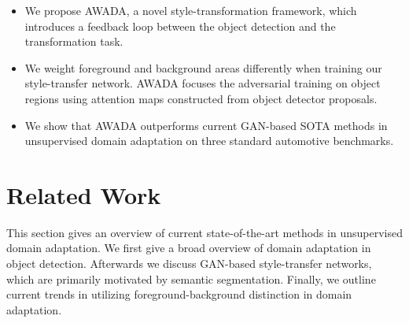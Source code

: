 \documentclass[10pt,twocolumn,letterpaper]{article}
\begin{document}
\begin{itemize}
	\item We propose AWADA, a novel style-transformation framework, which introduces a feedback loop between the object detection and the transformation task. 
	\item We weight foreground and background areas differently when training our style-transfer network. AWADA focuses the adversarial training on object regions using attention maps constructed from object detector proposals.
	\item We show that AWADA outperforms current GAN-based SOTA methods in unsupervised domain adaptation on three standard automotive benchmarks.
\end{itemize}

\section{Related Work}

This section gives an overview of current state-of-the-art methods in unsupervised domain adaptation. We first give a broad overview of domain adaptation in object detection. Afterwards we discuss GAN-based style-transfer networks, which are primarily motivated by semantic segmentation. Finally, we outline current trends in utilizing foreground-background distinction in domain adaptation. 
\end{document}
